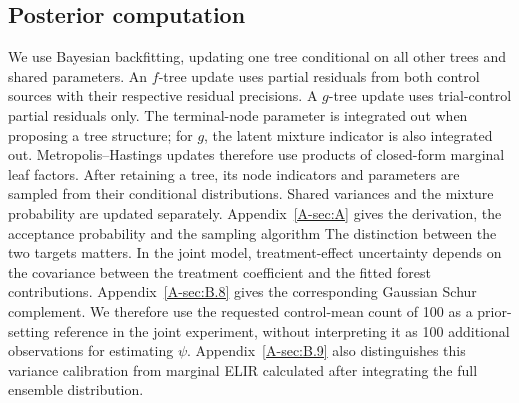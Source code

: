 \documentclass[11pt]{article}
\theoremstyle{remark}\newtheorem{remark}{Remark}[section]
\providecommand{\DIFaddtex}[1]{{\protect\color{blue} \sf #1}} %
\providecommand{\DIFdeltex}[1]{{\protect\color{red} \scriptsize #1}} %
\providecommand{\DIFaddbegin}{} %
\providecommand{\DIFaddend}{} %
\providecommand{\DIFdelbegin}{} %
\providecommand{\DIFdelend}{} %
\providecommand{\DIFadd}[1]{\texorpdfstring{\DIFaddtex{#1}}{#1}} %
\providecommand{\DIFdel}[1]{\texorpdfstring{\DIFdeltex{#1}}{}} %
\begin{document}
\DIFdelbegin \subsection{\DIFdel{Posterior computation}}
\addtocounter{subsection}{-1}%
\DIFdel{We use Bayesian backfitting, updating one tree conditional on all other trees and shared parameters. An $f$-tree update uses partial residuals from both control sources with their respective residual precisions. A $g$-tree update uses trial-control partial residuals only. The terminal-node parameter is integrated out when proposing a tree structure; for $g$, the latent mixture indicator is also integrated out. Metropolis--Hastings updates therefore use products of closed-form marginal leaf factors. After retaining a tree, its node indicators and parameters are sampled from their conditional distributions. Shared variances and the mixture probability are updated separately. Appendix~\ref{A-sec:A} gives the derivation, the acceptance probability and the sampling algorithm}\DIFdelend \DIFaddbegin \DIFadd{The distinction between the two targets matters. In the joint model, treatment-effect uncertainty depends on the covariance between the treatment coefficient and the fitted forest contributions. Appendix~\ref{A-sec:B.8} gives the corresponding Gaussian Schur complement. We therefore use the requested control-mean count of 100 as a prior-setting reference in the joint experiment, without interpreting it as 100 additional observations for estimating $\psi$. Appendix~\ref{A-sec:B.9} also distinguishes this variance calibration from marginal ELIR calculated after integrating the full ensemble distribution}\DIFaddend .
\end{document}
